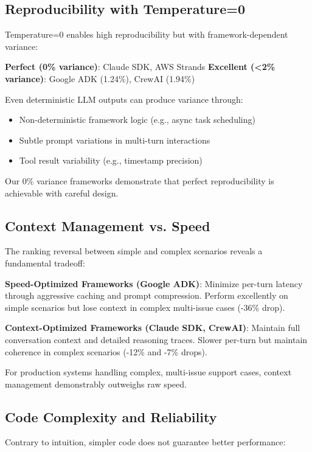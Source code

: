 \documentclass[sigconf,nonacm]{acmart}
\begin{document}
\subsection{Reproducibility with Temperature=0}

Temperature=0 enables high reproducibility but with framework-dependent variance:

\textbf{Perfect (0\% variance)}: Claude SDK, AWS Strands
\textbf{Excellent (<2\% variance)}: Google ADK (1.24\%), CrewAI (1.94\%)

Even deterministic LLM outputs can produce variance through:
\begin{itemize}
\item Non-deterministic framework logic (e.g., async task scheduling)
\item Subtle prompt variations in multi-turn interactions
\item Tool result variability (e.g., timestamp precision)
\end{itemize}

Our 0\% variance frameworks demonstrate that perfect reproducibility is achievable with careful design.

\subsection{Context Management vs. Speed}

The ranking reversal between simple and complex scenarios reveals a fundamental tradeoff:

\textbf{Speed-Optimized Frameworks (Google ADK)}: Minimize per-turn latency through aggressive caching and prompt compression. Perform excellently on simple scenarios but lose context in complex multi-issue cases (-36\% drop).

\textbf{Context-Optimized Frameworks (Claude SDK, CrewAI)}: Maintain full conversation context and detailed reasoning traces. Slower per-turn but maintain coherence in complex scenarios (-12\% and -7\% drops).

For production systems handling complex, multi-issue support cases, context management demonstrably outweighs raw speed.

\subsection{Code Complexity and Reliability}

Contrary to intuition, simpler code does not guarantee better performance:
\end{document}
